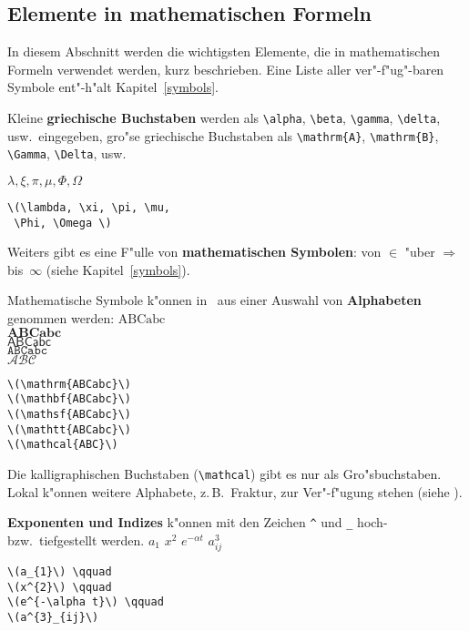 \subsection{Elemente in mathematischen Formeln}
 
In diesem Abschnitt werden die wichtigsten Elemente, die in
mathematischen Formeln verwendet werden, kurz beschrieben.  Eine
Liste aller ver"-f"ug"-baren Symbole ent"-h"alt
Kapitel~\ref{symbols}.
 
\bigskip

\begin{sloppypar} 
\relax %
Kleine \textbf{griechische Buchstaben} werden als \verb|\alpha|,
\verb|\beta|, \verb|\gamma|, \verb|\delta|, usw.\ eingegeben,
gro"se griechische Buchstaben als \verb|\mathrm{A}|,
\verb|\mathrm{B}|, \verb|\Gamma|, \verb|\Delta|, usw.
\end{sloppypar}
\exa
\(\lambda, \xi, \pi, \mu,
 \Phi, \Omega \)
\exb
\begin{verbatim}
\(\lambda, \xi, \pi, \mu,
 \Phi, \Omega \)
\end{verbatim}
\exc
 
Weiters gibt es eine F"ulle von \textbf{mathematischen Symbolen}:
von \(\in\) "uber \(\Rightarrow\) bis~\(\infty\) (siehe
Kapitel~\ref{symbols}).
 
\bigskip

Mathematische Symbole k"onnen in \LaTeXe\ aus einer Auswahl von
\textbf{Alphabeten} genommen werden:
\exa
\(\mathrm{ABCabc}\) \\
\(\mathbf{ABCabc}\) \\
\(\mathsf{ABCabc}\) \\
\(\mathtt{ABCabc}\) \\
\(\mathcal{ABC}\)
\exb
\begin{verbatim}
\(\mathrm{ABCabc}\)
\(\mathbf{ABCabc}\)
\(\mathsf{ABCabc}\)
\(\mathtt{ABCabc}\)
\(\mathcal{ABC}\)
\end{verbatim}
\exc
Die kalligraphischen Buchstaben (\verb:\mathcal:) gibt es nur als
Gro"sbuchstaben. Lokal k"onnen weitere Alphabete, z.\,B.\ 
Fraktur, zur Ver"-f"ugung stehen (siehe \local).

\bigskip

\textbf{Exponenten und Indizes} k"onnen mit den Zeichen \verb|^|
und \verb|_| hoch- bzw.\ tiefgestellt werden.
\exa
\(a_{1}\) \qquad
\(x^{2}\) \qquad
\(e^{-\alpha t}\) \qquad
\(a^{3}_{ij}\)
\exb
\begin{verbatim}
\(a_{1}\) \qquad
\(x^{2}\) \qquad
\(e^{-\alpha t}\) \qquad
\(a^{3}_{ij}\)
\end{verbatim}
\exc
 
